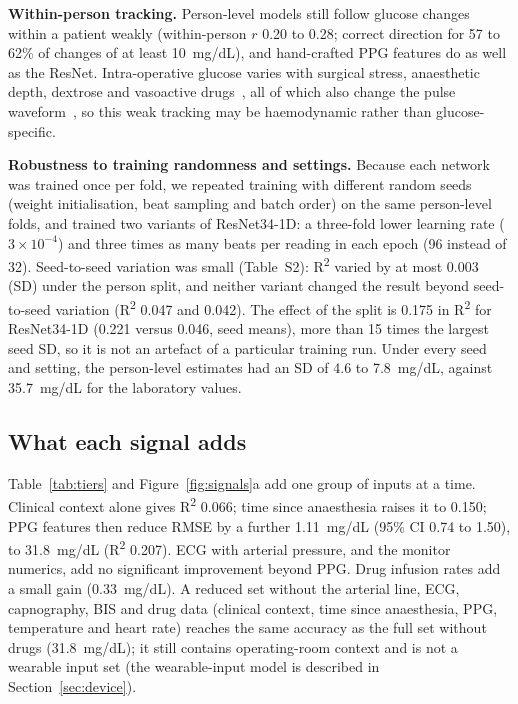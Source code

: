 \documentclass[11pt]{article}
\newcommand{\RR}{R\textsuperscript{2}}
\newcommand{\mgdl}{mg/dL}
\begin{document}
\textbf{Within-person tracking.} Person-level models still follow glucose changes within a patient weakly (within-person $r$ 0.20 to 0.28; correct direction for 57 to 62\% of changes of at least 10~\mgdl{}), and hand-crafted PPG features do as well as the ResNet. Intra-operative glucose varies with surgical stress, anaesthetic depth, dextrose and vasoactive drugs~\citep{duggan2017}, all of which also change the pulse waveform~\citep{allen2007}, so this weak tracking may be haemodynamic rather than glucose-specific.

\textbf{Robustness to training randomness and settings.} Because each network was trained once per fold, we repeated training with different random seeds (weight initialisation, beat sampling and batch order) on the same person-level folds, and trained two variants of ResNet34-1D: a three-fold lower learning rate ($3\times10^{-4}$) and three times as many beats per reading in each epoch (96 instead of 32). Seed-to-seed variation was small (Table~S2): \RR{} varied by at most 0.003 (SD) under the person split, and neither variant changed the result beyond seed-to-seed variation (\RR{} 0.047 and 0.042). The effect of the split is 0.175 in \RR{} for ResNet34-1D (0.221 versus 0.046, seed means), more than 15 times the largest seed SD, so it is not an artefact of a particular training run. Under every seed and setting, the person-level estimates had an SD of 4.6 to 7.8~\mgdl{}, against 35.7~\mgdl{} for the laboratory values.


\subsection{What each signal adds}
\label{sec:signals}
Table~\ref{tab:tiers} and Figure~\ref{fig:signals}a add one group of inputs at a time. Clinical context alone gives \RR{} 0.066; time since anaesthesia raises it to 0.150; PPG features then reduce RMSE by a further 1.11~\mgdl{} (95\% CI 0.74 to 1.50), to 31.8~\mgdl{} (\RR{} 0.207). ECG with arterial pressure, and the monitor numerics, add no significant improvement beyond PPG. Drug infusion rates add a small gain (0.33~\mgdl{}). A reduced set without the arterial line, ECG, capnography, BIS and drug data (clinical context, time since anaesthesia, PPG, temperature and heart rate) reaches the same accuracy as the full set without drugs (31.8~\mgdl{}); it still contains operating-room context and is not a wearable input set (the wearable-input model is described in Section~\ref{sec:device}).
\end{document}
